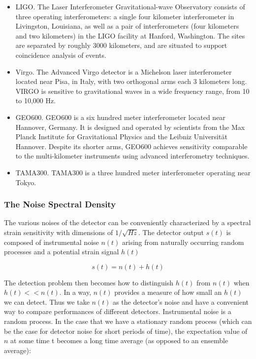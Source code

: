 \documentclass[binding=0.6cm, LaM]{sapthesis}
\begin{document}
		\begin{itemize}
  			\item LIGO. The Laser Interferometer Gravitational-wave Observatory consists of three operating interferometers:
			      a single four kilometer interferometer in Livingston, Louisiana, 
			      as well as a pair of interferometers (four kilometers and two kilometers) in the LIGO facility at Hanford, Washington.
			      The sites are separated by roughly 3000 kilometers, and are situated to support coincidence analysis of events.
  			\item Virgo. The Advanced Virgo detector is a Michelson laser interferometer located near Pisa, 
			      in Italy, with two orthogonal arms each 3 kilometers long. 
			      VIRGO is sensitive to gravitational waves in a wide frequency range, from 10 to 10,000 Hz. 
  			\item GEO600. GEO600 is a six hundred meter interferometer located near Hannover, 
			      Germany. It is designed and operated by scientists from the 
			      Max Planck Institute for Gravitational Physics and the Leibniz Universität Hannover.
 			      Despite its shorter arms, GEO600 achieves sensitivity comparable to 
			      the multi-kilometer instruments using advanced interferometry techniques.
  			\item TAMA300. TAMA300 is a three hundred meter interferometer operating near Tokyo.

\end{itemize}

\subsubsection{The Noise Spectral Density}

	The various noises of the detector can be conveniently characterized by a spectral strain
	sensitivity with dimensions of $1/\sqrt{Hz}$.
	The detector output $s(t)$ is composed of instrumental noise $n(t)$ arising from 
	naturally occurring random processes and a potential strain signal $h(t)$

		\begin{equation}
		s(t) = n(t) + h(t)
		\end{equation}

	The detection problem then becomes how to distinguish $h(t)$ from $n(t)$ when $h(t) << n(t)$. 
	In a way, $n(t)$ provides a measure of how small an $h(t)$ we can detect. 
	Thus we take $n(t)$ as the detector’s noise and have a convenient way to 
	compare performances of different detectors. 
	Instrumental noise is a random process. In the case that we have a stationary 
	random process (which can be the case for detector noise for short periods of time), 
	the expectation value of $n$ at some time t becomes a long time average (as opposed to an ensemble average):
\end{document}
